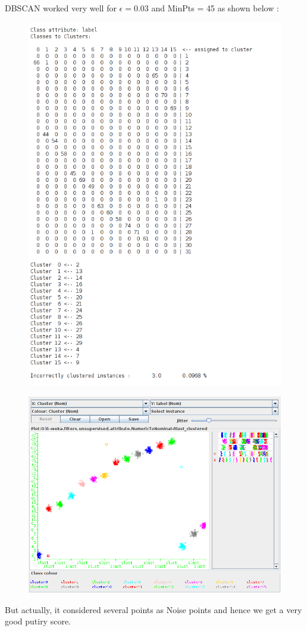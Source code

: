 \documentclass[paper=a4, fontsize=11pt]{scrartcl}
\numberwithin{equation}{section}		%
\numberwithin{figure}{section}			%
\numberwithin{table}{section}				%
\begin{document}
DBSCAN worked very well for $\epsilon = 0.03$ and MinPts = 45 as shown below :
\begin{figure}[H]
	\centering
  \includegraphics[width=1\textwidth]{6db3}
\end{figure}

\begin{figure}[H]
	\centering
  \includegraphics[width=1\textwidth]{6db4}
\end{figure}
But actually, it considered several points as Noise points and hence we get a very good putiry score. \\
\end{document}
